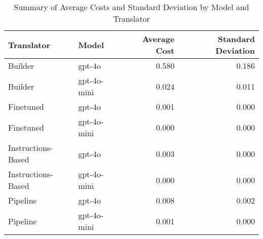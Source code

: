 \begin{table}
\caption{Summary of Average Costs and Standard Deviation by Model and Translator}
\label{tab:average_cost_summary}
\begin{tabular}{llrr}
\toprule
Translator & Model & Average Cost & Standard Deviation \\
\midrule
Builder & gpt-4o & 0.580 & 0.186 \\
Builder & gpt-4o-mini & 0.024 & 0.011 \\
Finetuned & gpt-4o & 0.001 & 0.000 \\
Finetuned & gpt-4o-mini & 0.000 & 0.000 \\
Instructions-Based & gpt-4o & 0.003 & 0.000 \\
Instructions-Based & gpt-4o-mini & 0.000 & 0.000 \\
Pipeline & gpt-4o & 0.008 & 0.002 \\
Pipeline & gpt-4o-mini & 0.001 & 0.000 \\
\bottomrule
\end{tabular}
\end{table}
